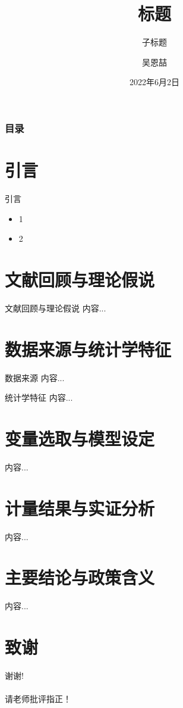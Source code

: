 \documentclass{beamer}
\author[Enzhe Wu]{吴恩喆}
\title[标题]{标题}
\subtitle{子标题}
\institute[HZAU]{华中农业大学
	
	经济管理学院}
\date[2022.06.02]{2022年6月2日}
\begin{document}
	\kaishu
	
	\frame{\titlepage}
	
	\begin{frame}
		\frametitle{目录}
		\tableofcontents
	\end{frame}
	
	\section{引言}
	\begin{frame}{引言}
		\begin{itemize}
			\item 1
			\item 2
		\end{itemize}
	\end{frame}

	\section{文献回顾与理论假说}
	\begin{frame}{文献回顾与理论假说}
		内容...
	\end{frame}
	
	\section{数据来源与统计学特征}
	\begin{frame}{数据来源}
		内容...
	\end{frame}
	\begin{frame}{统计学特征}
		内容...
	\end{frame}

	\section{变量选取与模型设定}
	\begin{frame}{}
		内容...
	\end{frame}

	\section{计量结果与实证分析}
	\begin{frame}{}
		内容...
	\end{frame}

	\section{主要结论与政策含义}
	\begin{frame}{}
		内容...
	\end{frame}
	
	\section*{致谢}  
	\begin{frame}
		\begin{center}
			\textcolor{myNewColorA}{\huge {谢谢!\\ \quad \\ 请老师批评指正！}}
		\end{center}
	\end{frame}
	
\end{document}
